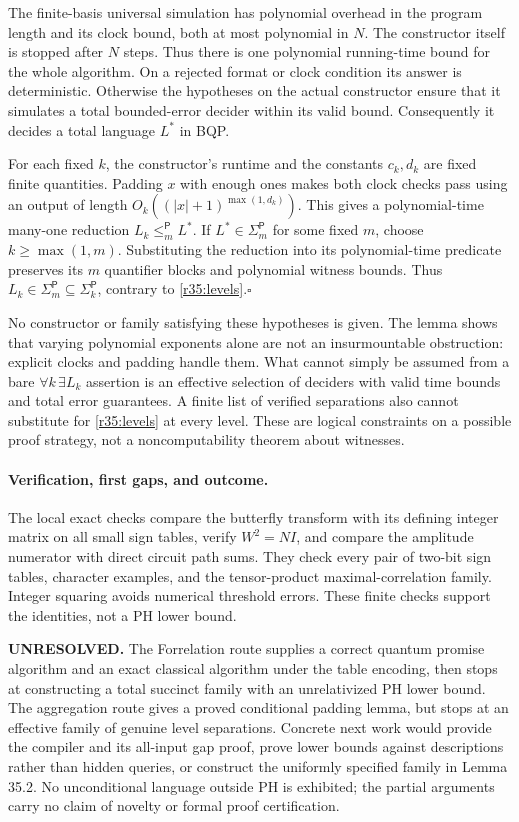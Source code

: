 \documentclass[11pt]{article}
\begin{document}
The finite-basis universal simulation has polynomial overhead in the
program length and its clock bound, both at most polynomial in $N$.
The constructor itself is stopped after $N$ steps. Thus there is one
polynomial running-time bound for the whole algorithm. On a rejected
format or clock condition its answer is deterministic. Otherwise the
hypotheses on the actual constructor ensure that it simulates a total
bounded-error decider within its valid bound. Consequently it decides a
total language $L^*$ in BQP.

For each fixed $k$, the constructor's runtime and the constants $c_k,d_k$
are fixed finite quantities. Padding $x$ with enough ones makes both clock
checks pass using an output of length $O_k((|x|+1)^{\max(1,d_k)})$.
This gives a polynomial-time many-one reduction $L_k\le_m^{\mathsf P}L^*$.
If $L^*\in\Sigma_m^{\mathsf P}$ for some fixed $m$, choose $k\ge\max(1,m)$.
Substituting the reduction into its polynomial-time predicate preserves
its $m$ quantifier blocks and polynomial witness bounds. Thus
$L_k\in\Sigma_m^{\mathsf P}\subseteq\Sigma_k^{\mathsf P}$, contrary to
\eqref{r35:levels}.\hfill$\square$

No constructor or family satisfying these hypotheses is given. The lemma
shows that varying polynomial exponents alone are not an insurmountable
obstruction: explicit clocks and padding handle them. What cannot simply
be assumed from a bare $\forall k\,\exists L_k$ assertion is an effective
selection of deciders with valid time bounds and total error guarantees.
A finite list of verified separations also cannot substitute for
\eqref{r35:levels} at every level. These are logical constraints on a
possible proof strategy, not a noncomputability theorem about witnesses.

\paragraph{Verification, first gaps, and outcome.}
The local exact checks compare the butterfly transform with its defining
integer matrix on all small sign tables, verify $W^2=NI$, and compare the
amplitude numerator with direct circuit path sums. They check every pair
of two-bit sign tables, character examples, and the tensor-product
maximal-correlation family. Integer squaring avoids numerical threshold
errors. These finite checks support the identities, not a PH lower bound.

\textbf{UNRESOLVED.} The Forrelation route supplies a correct quantum
promise algorithm and an exact classical algorithm under the table
encoding, then stops at constructing a total succinct family with an
unrelativized PH lower bound. The aggregation route gives a proved
conditional padding lemma, but stops at an effective family of genuine
level separations. Concrete next work would provide the compiler and its
all-input gap proof, prove lower bounds against descriptions rather than
hidden queries, or construct the uniformly specified family in Lemma 35.2.
No unconditional language outside PH is exhibited; the partial arguments
carry no claim of novelty or formal proof certification.
\end{document}
